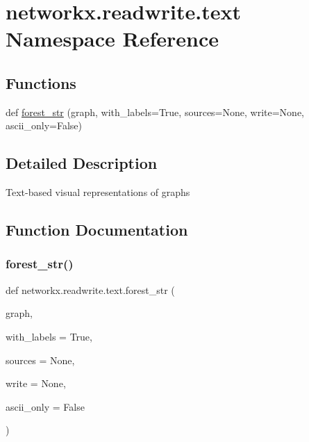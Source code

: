 \hypertarget{namespacenetworkx_1_1readwrite_1_1text}{}\section{networkx.\+readwrite.\+text Namespace Reference}
\label{namespacenetworkx_1_1readwrite_1_1text}
\subsection*{Functions}
\begin{DoxyCompactItemize}
\item 
def \hyperlink{namespacenetworkx_1_1readwrite_1_1text_adb0064739d91280a4cbc8d8ea08b7952}{forest\+\_\+str} (graph, with\+\_\+labels=True, sources=None, write=None, ascii\+\_\+only=False)
\end{DoxyCompactItemize}


\subsection{Detailed Description}
\begin{DoxyVerb}Text-based visual representations of graphs
\end{DoxyVerb}
 

\subsection{Function Documentation}
\mbox{\label{namespacenetworkx_1_1readwrite_1_1text_adb0064739d91280a4cbc8d8ea08b7952}} 
\subsubsection{\texorpdfstring{forest\+\_\+str()}{forest\_str()}}
{\footnotesize\ttfamily def networkx.\+readwrite.\+text.\+forest\+\_\+str (\begin{DoxyParamCaption}\item[{}]{graph,  }\item[{}]{with\+\_\+labels = {\ttfamily True},  }\item[{}]{sources = {\ttfamily None},  }\item[{}]{write = {\ttfamily None},  }\item[{}]{ascii\+\_\+only = {\ttfamily False} }\end{DoxyParamCaption})}

